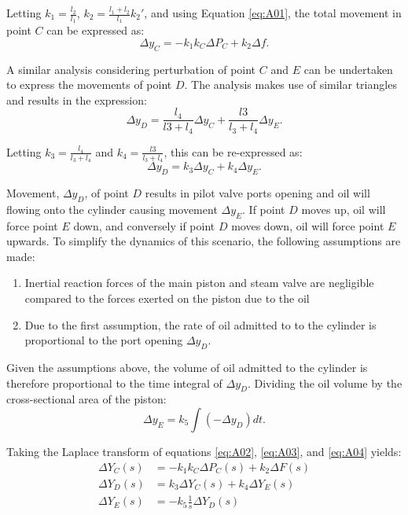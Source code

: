 Letting $k_1 = \frac{l_2}{l_1}$, $k_2 = \frac{l_1 + l_2}{l_1} k_2'$, and using Equation \ref{eq:A01}, the total movement in point $C$ can be expressed as:
\begin{equation}
	\Delta y_C = - k_1 k_C \Delta P_C + k_2 \Delta f. \label{eq:A02}
\end{equation}

A similar analysis considering perturbation of point $C$ and $E$ can be undertaken to express the movements of point $D$. The analysis makes use of similar triangles and results in the expression:
\begin{equation}
	\Delta y_D = \frac{l_4}{l3 + l_4} \Delta y_C + \frac{l3}{l_3 + l_4} \Delta y_E.
\end{equation}

Letting $k_3 = \frac{l_4}{l_3 + l_4}$ and $k_4 = \frac{l3}{l_3 + l_4}$, this can be re-expressed as:
\begin{equation}
	\Delta y_D = k_3 \Delta y_C + k_4 \Delta y_E. \label{eq:A03}
\end{equation}

Movement, $\Delta y_D$, of point $D$ results in pilot valve ports opening and oil will flowing onto the cylinder causing movement $\Delta y_E$. If point $D$ moves up, oil will force point $E$ down, and conversely if point $D$ moves down, oil will force point $E$ upwards. To simplify the dynamics of this scenario, the following assumptions are made:
\begin{enumerate}
	\item Inertial reaction forces of the main piston and steam valve are negligible compared to the forces exerted on the piston due to the oil
	\item Due to the first assumption, the rate of oil admitted to to the cylinder is proportional to the port opening $\Delta y_D$.
\end{enumerate}

Given the assumptions above, the volume of oil admitted to the cylinder is therefore proportional to the time integral of $\Delta y_D$. Dividing the oil volume by the cross-sectional area of the piston:
\begin{equation}
	\Delta y_E = k_5 \int (- \Delta y_D) dt. \label{eq:A04}
\end{equation}

Taking the Laplace transform of equations \ref{eq:A02}, \ref{eq:A03}, and \ref{eq:A04} yields:
\begin{align}
	\Delta Y_C(s) &= -k_1 k_C \Delta P_C(s) + k_2 \Delta F(s) \label{eq:A05} \\
	\Delta Y_D(s) &= k_3 \Delta Y_C(s) + k_4 \Delta Y_E(s) \label{eq:A06} \\
	\Delta Y_E(s) &= - k_5 \frac{1}{s} \Delta Y_D(s) \label{eq:A07}
\end{align}

